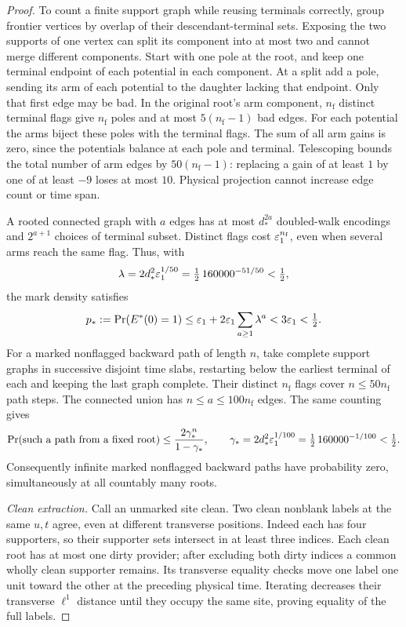 \begin{proof}
To count a finite support graph while reusing terminals correctly,
group frontier vertices by overlap of their descendant-terminal
sets. Exposing the two supports of one vertex can split its
component into at most two and cannot merge different components.
Start with one pole at the root, and keep one terminal endpoint
of each potential in each component.
At a split add a pole, sending its arm of each potential to the
daughter lacking that endpoint. Only that first edge may be bad.
In the original root's arm component, \(n_{\mathrm f}\) distinct
terminal flags give \(n_{\mathrm f}\) poles and at most
\(5(n_{\mathrm f}-1)\) bad edges. For each potential the arms
biject these poles with the terminal flags. The sum of all arm
gains is zero, since the potentials balance at each pole and
terminal. Telescoping bounds the total number of arm edges by
\(50(n_{\mathrm f}-1)\): replacing a gain of at least \(1\) by
one of at least \(-9\) loses at most \(10\).
Physical projection cannot increase
edge count or time span.

A rooted connected graph with \(a\) edges has at most
\(d_*^{2a}\) doubled-walk encodings and \(2^{a+1}\) choices of
terminal subset. Distinct flags cost \(\varepsilon_1^{n_{\mathrm f}}\), even when
several arms reach the same flag. Thus, with
\[
 \lambda=2d_*^2\varepsilon_1^{1/50}
       =\tfrac12\,160000^{-51/50}<\tfrac12,
\]
the mark density satisfies
\begin{equation}\label{eq:mark-density}
 p_*:=\Pr(E^*(0)=1)
 \le\varepsilon_1+2\varepsilon_1\sum_{a\ge1}\lambda^a
 <3\varepsilon_1<\tfrac12.
\end{equation}
For a marked nonflagged backward path of length \(n\), take complete
support graphs in successive disjoint time slabs, restarting below
the earliest terminal of each and keeping the last graph complete.
Their distinct \(n_{\mathrm f}\) flags cover \(n\le50n_{\mathrm f}\)
path steps. The connected union has \(n\le a\le100n_{\mathrm f}\)
edges. The same counting gives
\begin{equation}\label{eq:marked-path}
 \Pr(\text{such a path from a fixed root})
 \le \frac{2\gamma_*^n}{1-\gamma_*},\qquad
 \gamma_*=2d_*^2\varepsilon_1^{1/100}
         =\tfrac12\,160000^{-1/100}<\tfrac12.
\end{equation}
Consequently infinite marked nonflagged backward paths have
probability zero, simultaneously at all countably many roots.

\emph{Clean extraction.}
Call an unmarked site clean. Two clean nonblank labels at the
same \(u,t\) agree, even at different transverse positions.
Indeed each has four supporters, so their supporter sets intersect
in at least three indices. Each clean root has at most one dirty
provider; after excluding both dirty indices a common wholly clean
supporter remains. Its transverse equality checks move one label
one unit toward the other at the preceding physical time.
Iterating decreases their transverse \(\ell^1\) distance until
they occupy the same site, proving equality of the full labels.


\end{proof}
